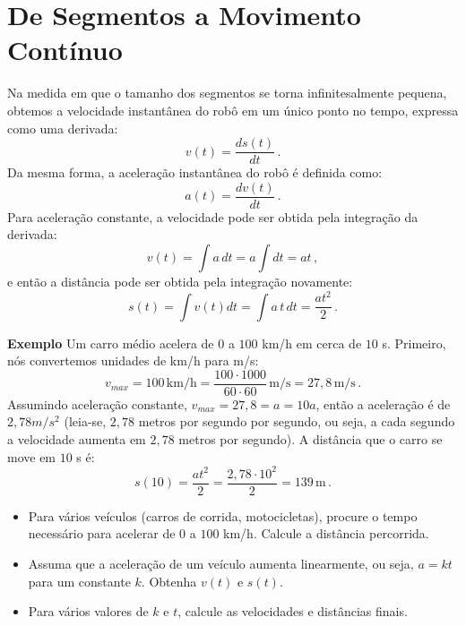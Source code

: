 \section{De Segmentos a Movimento Contínuo}\label{s.continuous}

Na medida em que o tamanho dos segmentos se torna infinitesalmente pequena, obtemos a velocidade instantânea do robô em um único ponto no tempo, expressa como uma derivada:
\[v(t) = \frac{ds(t)}{dt}\,.\]
Da mesma forma, a aceleração instantânea do robô é definida como:
\[a(t) = \frac{dv(t)}{dt}\,.\]
Para aceleração constante, a velocidade pode ser obtida pela integração da derivada:
\[v(t) = \int a\, dt = a\int {dt} = at\,,\]
e então a distância pode ser obtida pela integração novamente:
\[s(t) = \int v(t) dt=\int a\,t\,dt = \frac{at^2}{2}\,.\]

\noindent{}\textbf{Exemplo} Um carro médio acelera de $0$ a $100$ km/h em cerca de $10$ s. Primeiro, nós convertemos unidades de km/h para m/s:
\[
v_{\textit{max}} = 100\, \textrm{km/h} = \frac{100\cdot 1000}{60\cdot 60} \,\textrm{m/s} = 27,\!8 \,\textrm{m/s}\,.
\]
Assumindo aceleração constante, $v_{\textit{max}} = 27,\!8 = a = 10a$, então a aceleração é de $2,\!78 m/s^{2}$ (leia-se, $2,\!78$ metros por segundo por segundo, ou seja, a cada segundo a velocidade aumenta em $2,78$ metros por segundo). A distância que o carro se move em $10$ s é:
\[s(10) = \frac{at^2}{2} = \frac{2,\!78\cdot 10^2}{2}= 139 \,\textrm{m}\,.\]

\begin{framed}

\begin{itemize}
\item Para vários veículos (carros de corrida, motocicletas), procure o tempo necessário para acelerar de $0$ a $100$ km/h. Calcule a distância percorrida.
\item Assuma que a aceleração de um veículo aumenta linearmente, ou seja, $a=kt$ para um constante $k$. Obtenha $v(t)$ e $s(t)$.
\item Para vários valores de $k$ e $t$, calcule as velocidades e distâncias finais.
\end{itemize}
\end{framed}

